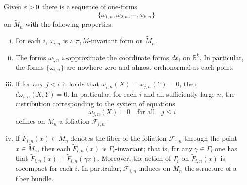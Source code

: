 \documentclass{amsart}
\begin{document}
\begin{lem}
Given $\varepsilon>0$ there is a sequence of one-forms
$$\{\omega_{1,n},\omega_{2,n},\cdots,\omega_{k,n}\}$$
on $\tilde M_n$
with the following properties:
\begin{enumerate}[(i)]
\item For each $i$, $\omega_{i,n}$ is a $\pi_1M$-invariant form on $\tilde M_n$.
\item The forms $\omega_{i,n}$ $\varepsilon$-approximate
the coordinate forms $dx_i$ on $\mathbb{R}^k$.
In particular, the forms $\{\omega_{i,n}\}$ are nowhere zero
and almost orthonormal at each point.
\item
If for any $j<i$ it holds that
$\omega_{j,n}(X)=\omega_{j,n}(Y)=0$, then $d\omega_{i,n}(X,Y)=0$.
In particular,
for each $i$ and all sufficiently large $n$,
the distribution corresponding to the system of equations
$$\omega_{j,n}(X)=0 \quad\text{for all}\quad j\le i$$
defines  on $\tilde M_n$ a foliation $\mathcal F_{i,n}$.

\item
If $\tilde F_{i,n}(x)\subset \tilde M_n$ denotes
the fiber of the foliation $\mathcal F_{i,n}$ through the point $x\in \tilde M_n$,
then each $\tilde F_{i,n}(x)$ is $\Gamma_i$-invariant;
that is,  for any $\gamma\in \Gamma_i$
one has that $\tilde F_{i,n}(x)=\tilde F_{i,n}(\gamma x)$.
 Moreover, the action of $\Gamma_i$ on $\tilde F_{i,n}(x)$ is cocompact
for each $i$. In particular, $\mathcal F_{i,n}$ induces on $M_n$
the structure of a fiber bundle.
\end{enumerate}
\end{lem}
\end{document}
